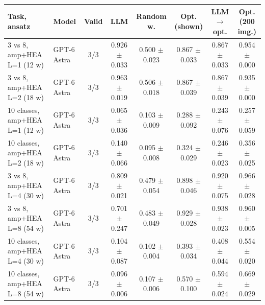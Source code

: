 \begin{tabular}{llcccccc}
\toprule
Task, ansatz & Model & Valid & LLM & Random w. & Opt. (shown) & LLM$\to$opt. & Opt. (200 img.) \\
\midrule
3 vs 8, amp+HEA L=1 (12 w) & GPT-6 Astra & 3/3 & 0.926 $\pm$ 0.033 & 0.500 $\pm$ 0.023 & 0.867 $\pm$ 0.033 & 0.867 $\pm$ 0.033 & 0.954 $\pm$ 0.000 \\
3 vs 8, amp+HEA L=2 (18 w) & GPT-6 Astra & 3/3 & 0.963 $\pm$ 0.019 & 0.506 $\pm$ 0.018 & 0.867 $\pm$ 0.039 & 0.867 $\pm$ 0.039 & 0.935 $\pm$ 0.000 \\
10 classes, amp+HEA L=1 (12 w) & GPT-6 Astra & 3/3 & 0.065 $\pm$ 0.036 & 0.103 $\pm$ 0.009 & 0.288 $\pm$ 0.092 & 0.243 $\pm$ 0.076 & 0.257 $\pm$ 0.059 \\
10 classes, amp+HEA L=2 (18 w) & GPT-6 Astra & 3/3 & 0.140 $\pm$ 0.066 & 0.095 $\pm$ 0.008 & 0.324 $\pm$ 0.029 & 0.246 $\pm$ 0.023 & 0.356 $\pm$ 0.025 \\
3 vs 8, amp+HEA L=4 (30 w) & GPT-6 Astra & 3/3 & 0.809 $\pm$ 0.021 & 0.479 $\pm$ 0.054 & 0.898 $\pm$ 0.046 & 0.920 $\pm$ 0.075 & 0.966 $\pm$ 0.028 \\
3 vs 8, amp+HEA L=8 (54 w) & GPT-6 Astra & 3/3 & 0.701 $\pm$ 0.247 & 0.483 $\pm$ 0.049 & 0.929 $\pm$ 0.028 & 0.938 $\pm$ 0.023 & 0.960 $\pm$ 0.005 \\
10 classes, amp+HEA L=4 (30 w) & GPT-6 Astra & 3/3 & 0.104 $\pm$ 0.087 & 0.102 $\pm$ 0.004 & 0.393 $\pm$ 0.034 & 0.408 $\pm$ 0.044 & 0.554 $\pm$ 0.020 \\
10 classes, amp+HEA L=8 (54 w) & GPT-6 Astra & 3/3 & 0.096 $\pm$ 0.006 & 0.107 $\pm$ 0.006 & 0.570 $\pm$ 0.100 & 0.594 $\pm$ 0.024 & 0.669 $\pm$ 0.029 \\
\bottomrule
\end{tabular}
